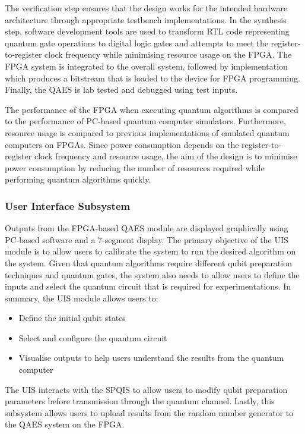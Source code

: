 The verification step ensures that the design works for the intended hardware architecture through appropriate testbench implementations. In the synthesis step, software development tools are used to transform RTL code representing quantum gate operations to digital logic gates and attempts to meet the register-to-register clock frequency while minimising resource usage on the FPGA. The FPGA system is integrated to the overall system, followed by implementation which produces a bitstream that is loaded to the device for FPGA programming. Finally, the QAES is lab tested and debugged using test inputs.

The performance of the FPGA when executing quantum algorithms is compared to the performance of PC-based quantum computer simulators. Furthermore, resource usage is compared to previous implementations of emulated quantum computers on FPGAs. Since power consumption depends on the register-to-register clock frequency and resource usage, the aim of the design is to minimise power consumption by reducing the number of resources required while performing quantum algorithms quickly.

\subsubsection{User Interface Subsystem}

Outputs from the FPGA-based QAES module are displayed graphically using PC-based software and a 7-segment display. The primary objective of the UIS module is to allow users to calibrate the system to run the desired algorithm on the system. Given that quantum algorithms require different qubit preparation techniques and quantum gates, the system also needs to allow users to define the inputs and select the quantum circuit that is required for experimentations. In summary, the UIS module allows users to:
\begin{itemize}
	\item 
	Define the initial qubit states
	\item 
	Select and configure the quantum circuit
	\item 
	Visualise outputs to help users understand the results from the quantum computer
\end{itemize}
The UIS interacts with the SPQIS to allow users to modify qubit preparation parameters before transmission through the quantum channel. Lastly, this subsystem allows users to upload results from the random number generator to the QAES system on the FPGA. 

